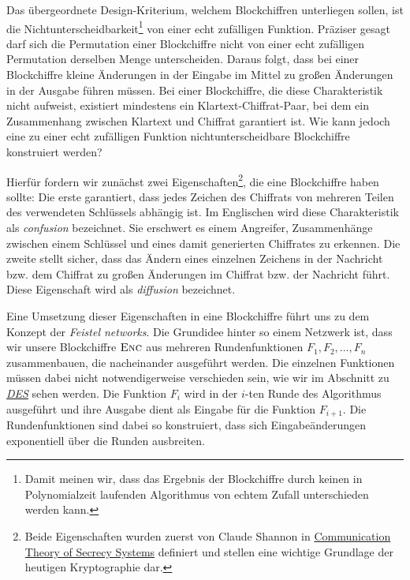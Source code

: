 Das übergeordnete Design-Kriterium, welchem Blockchiffren unterliegen sollen, ist die Nichtunterscheidbarkeit\footnote{Damit meinen wir, dass das Ergebnis der Blockchiffre durch keinen in Polynomialzeit laufenden Algorithmus von echtem Zufall unterschieden werden kann.} von einer echt zufälligen Funktion. Präziser gesagt darf sich die Permutation einer Blockchiffre nicht von einer echt zufälligen Permutation derselben Menge unterscheiden. Daraus folgt, dass bei einer Blockchiffre kleine Änderungen in der Eingabe im Mittel zu großen Änderungen in der Ausgabe führen müssen. Bei einer Blockchiffre, die diese Charakteristik nicht aufweist, existiert mindestens ein Klartext-Chiffrat-Paar, bei dem ein Zusammenhang zwischen Klartext und Chiffrat garantiert ist. Wie kann jedoch eine zu einer echt zufälligen Funktion nichtunterscheidbare Blockchiffre konstruiert werden?

Hierfür fordern wir zunächst zwei Eigenschaften\footnote{Beide Eigenschaften wurden zuerst von Claude Shannon in \href{http://netlab.cs.ucla.edu/wiki/files/shannon1949.pdf}{Communication Theory of Secrecy Systems} definiert und stellen eine wichtige Grundlage der heutigen Kryptographie dar.}, die eine Blockchiffre haben sollte:
Die erste garantiert, dass jedes Zeichen des Chiffrats von mehreren Teilen des verwendeten Schlüssels abhängig ist. Im Englischen wird diese Charakteristik als \textit{confusion} bezeichnet. Sie erschwert es einem Angreifer, Zusammenhänge zwischen einem Schlüssel und eines damit generierten Chiffrates zu erkennen.
Die zweite stellt sicher, dass das Ändern eines einzelnen Zeichens in der Nachricht bzw. dem Chiffrat zu großen Änderungen im Chiffrat bzw. der Nachricht führt. Diese Eigenschaft wird als \textit{diffusion} bezeichnet.

Eine Umsetzung dieser Eigenschaften in eine Blockchiffre führt uns zu dem Konzept der \textit{Feistel networks}.
Die Grundidee hinter so einem Netzwerk ist, dass wir unsere Blockchiffre \(\textsc{Enc}\) aus mehreren Rundenfunktionen \(F_1, F_2,\dots, F_n\) zusammenbauen, die nacheinander ausgeführt werden. Die einzelnen Funktionen müssen dabei nicht notwendigerweise verschieden sein, wie wir im Abschnitt zu \hyperref[sssec:des]{\textit{DES}} sehen werden. Die Funktion \(F_i\) wird in der $i$-ten Runde des Algorithmus ausgeführt und ihre Ausgabe dient als Eingabe für die Funktion \(F_{i+1}\). Die Rundenfunktionen sind dabei so konstruiert, dass sich Eingabeänderungen exponentiell über die Runden ausbreiten.


